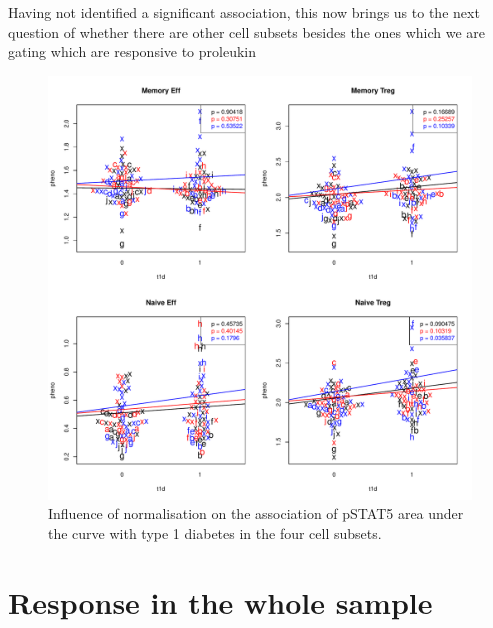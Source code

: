 Having not identified a significant association, this now brings us to the next question of whether there are other
cell subsets besides the ones which we are gating which are responsive to proleukin 


\begin{figure}[h]
    \centering
    \includegraphics[scale=.5]{IL2/figures/pstat5-auc-t1d-celltypes.pdf}
    { Influence of normalisation on the association of pSTAT5 area under the curve with type 1 diabetes in the four cell subsets. }
    { }
\end{figure}



\section{Response in the whole sample}

%


